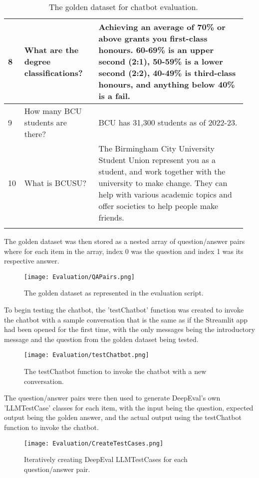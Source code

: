 \begin{longtable}{ | p{0.05\linewidth} | p{0.3\linewidth} | p{0.6\linewidth} | }
    \hline 
    8 & What are the degree classifications? &
    Achieving an average of 70\% or above grants you first-class honours. 60-69\% is an upper second (2:1), 50-59\% is a lower second (2:2), 40-49\% is third-class honours, and anything below 40\% is a fail. \\
    \hline 
    9 & How many BCU students are there? &
    BCU has 31,300 students as of 2022-23. \\ 
    \hline 
    10 & What is BCUSU? &
    The Birmingham City University Student Union represent you as a student, and work together with the university to make change. They can help with various academic topics and offer societies to help people make friends. \\
    \hline
    \caption{The golden dataset for chatbot evaluation.}\label{tab:GoldenDataset}
\end{longtable}

\para The golden dataset was then stored as a nested array of question/answer pairs where for each item in the array, index 0 was the question 
and index 1 was its respective answer. 

\begin{figure}[H]
    \centering
    \texttt{[image: Evaluation/QAPairs.png]}
    \caption{The golden dataset as represented in the evaluation script. \label{fig:GoldenDataset}}
\end{figure}

\noindent To begin testing the chatbot, the 'testChatbot' function was created to invoke the chatbot with 
a sample conversation that is the same as if the Streamlit app had been opened for the first time,
with the only messages being the introductory message and the question from the golden dataset being 
tested.

\begin{figure}[H]
    \centering
    \texttt{[image: Evaluation/testChatbot.png]}
    \caption{The testChatbot function to invoke the chatbot with a new conversation. \label{fig:testChatbot}}
\end{figure}

\noindent The question/answer pairs were then used to generate DeepEval's own 'LLMTestCase' classes for each item, 
with the input being the question, expected output being the golden answer, and the actual output using the 
testChatbot function to invoke the chatbot.

\begin{figure}[H]
    \centering
    \texttt{[image: Evaluation/CreateTestCases.png]}
    \caption{Iteratively creating DeepEval LLMTestCases for each question/answer pair. \label{fig:CreateTestCases}}
\end{figure}

